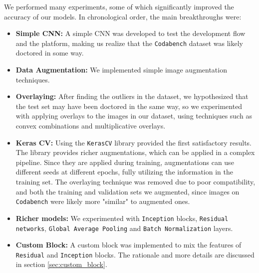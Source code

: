 \documentclass[11pt]{article}
\begin{document}
\begin{multicols}{2}
      We performed many experiments, some of which significantly improved the accuracy of our models. In chronological order, the main breakthroughs were:
      \begin{itemize}[leftmargin=*]
            \setlength\itemsep{0em}
            \item \textbf{Simple CNN:} A simple CNN was developed to test the development flow and the platform, making us realize that the \texttt{Codabench} dataset was likely doctored in some way.
            \item \textbf{Data Augmentation:} We implemented simple image augmentation techniques.
            \item \textbf{Overlaying:} After finding the outliers in the dataset, we hypothesized that the test set may have been doctored in the same way, so we experimented with applying overlays to the images in our dataset, using techniques such as convex combinations and multiplicative overlays.
            \item \textbf{Keras CV:} Using the \texttt{KerasCV} library\cite{chollet2015keras} provided the first satisfactory results. The library provides richer augmentations, which can be applied in a complex pipeline. Since they are applied during training, augmentations can use different seeds at different epochs, fully utilizing the information in the training set. The overlaying technique was removed due to poor compatibility, and both the training and validation sets we augmented, since images on \texttt{Codabench} were likely more "similar" to augmented ones.
            \item \textbf{Richer models:} We experimented with \texttt{In\-cep\-tion} blocks\cite{Inception}, \texttt{Re\-si\-dual net\-works}\cite{He2015DeepRL}, \texttt{Glo\-bal Aver\-age Poo\-ling} and \texttt{Batch Nor\-ma\-li\-za\-tion} layers.
            \item \textbf{Custom Block:} A custom block was implemented to mix the features of \texttt{Re\-si\-dual} and \texttt{In\-cep\-tion} blocks. The rationale and more details are discussed in section \ref{sec:custom_block}.
      \end{itemize}


\end{multicols}
\end{document}
